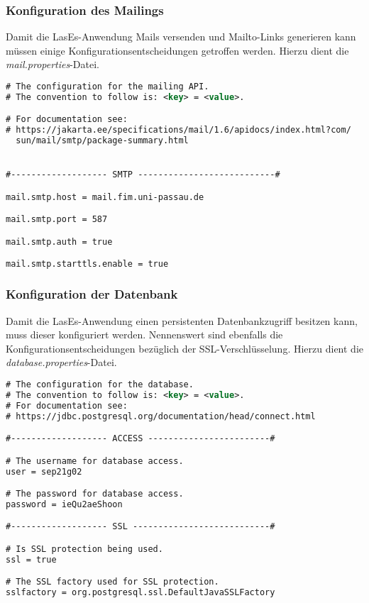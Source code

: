 \subsubsection{Konfiguration des Mailings}
Damit die LasEs-Anwendung Mails versenden und Mailto-Links generieren kann
müssen einige Konfigurationsentscheidungen getroffen werden.
Hierzu dient die \emph{mail.properties}-Datei.

\begin{lstlisting}[language=XML, caption = Die Mailingkonfiguration \emph{mail.properties}]
# The configuration for the mailing API.
# The convention to follow is: <key> = <value>.

# For documentation see:
# https://jakarta.ee/specifications/mail/1.6/apidocs/index.html?com/
  sun/mail/smtp/package-summary.html


#------------------- SMTP ---------------------------#

mail.smtp.host = mail.fim.uni-passau.de

mail.smtp.port = 587

mail.smtp.auth = true

mail.smtp.starttls.enable = true
\end{lstlisting}

\subsubsection{Konfiguration der Datenbank}
Damit die LasEs-Anwendung einen persistenten Datenbankzugriff besitzen kann,
muss dieser konfiguriert werden. Nennenswert sind ebenfalls die
Konfigurationsentscheidungen bezüglich der SSL-Verschlüsselung.
Hierzu dient die \emph{database.properties}-Datei.

\begin{lstlisting}[language=XML, caption = Die Datenbankkonfiguration \emph{database.properties}]
# The configuration for the database.
# The convention to follow is: <key> = <value>.
# For documentation see:
# https://jdbc.postgresql.org/documentation/head/connect.html

#------------------- ACCESS ------------------------#

# The username for database access.
user = sep21g02

# The password for database access.
password = ieQu2aeShoon

#------------------- SSL ---------------------------#

# Is SSL protection being used.
ssl = true

# The SSL factory used for SSL protection.
sslfactory = org.postgresql.ssl.DefaultJavaSSLFactory
\end{lstlisting}


